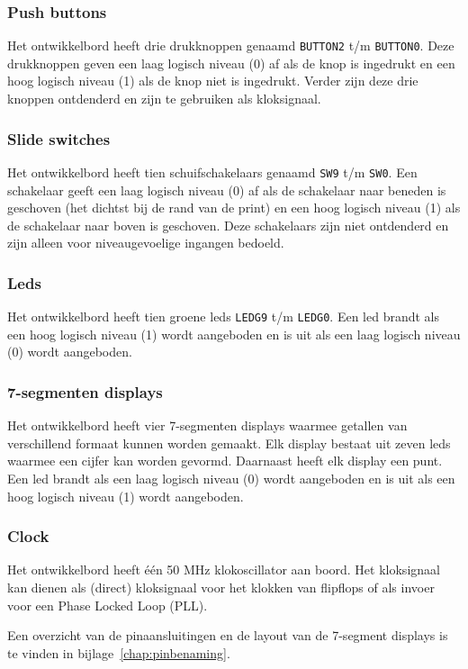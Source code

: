\documentclass[a4paper,12pt,fleqn,twoside]{book}
\newcommand{\naam}[1]{\texttt{#1}}
\begin{document}
\subsubsection{Push buttons}
Het ontwikkelbord heeft drie drukknoppen genaamd \naam{BUTTON2} t/m
\naam{BUTTON0}. Deze drukknoppen geven een laag logisch
niveau (0) af als de knop is ingedrukt en een hoog logisch niveau (1) als de
knop niet is ingedrukt. Verder zijn deze drie knoppen ontdenderd en zijn te
gebruiken als kloksignaal.

\subsubsection{Slide switches}
Het ontwikkelbord heeft tien schuifschakelaars genaamd \naam{SW9} t/m
\naam{SW0}. Een schakelaar geeft een laag
logisch niveau (0) af als de schakelaar naar beneden is geschoven (het dichtst
bij de rand van de print) en een hoog logisch niveau (1) als de schakelaar naar
boven is geschoven. Deze schakelaars zijn niet ontdenderd en zijn alleen voor
niveaugevoelige ingangen bedoeld.

\subsubsection{Leds}
Het ontwikkelbord heeft tien groene leds \naam{LEDG9} t/m \naam{LEDG0}. Een
led brandt als een hoog logisch niveau (1) wordt aangeboden en is uit als een
laag logisch niveau (0) wordt aangeboden.

\subsubsection{7-segmenten displays}
Het ontwikkelbord heeft vier 7-segmenten displays waarmee getallen van
verschillend formaat kunnen worden gemaakt. Elk display bestaat uit zeven leds
waarmee een cijfer kan worden gevormd. Daarnaast heeft elk display een punt.
Een led brandt als een laag logisch niveau (0) wordt aangeboden en is uit als
een hoog logisch niveau (1) wordt aangeboden.

\subsubsection{Clock}
Het ontwikkelbord heeft \'{e}\'{e}n 50 MHz klokoscillator aan boord. Het
kloksignaal kan dienen als (direct) kloksignaal voor het klokken van flipflops
of als invoer voor een Phase Locked Loop (PLL).

Een overzicht van de pinaansluitingen en de layout van de 7-segment displays
is te vinden in bijlage~\ref{chap:pinbenaming}.
\end{document}
